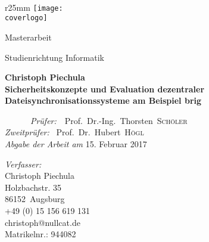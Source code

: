 \documentclass{scrartcl}
\makeatletter
\newcommand{\titel}{\Large Sicherheitskonzepte und Evaluation dezentraler Dateisynchronisationssysteme am Beispiel \frqq brig\flqq}
\newcommand{\untertitel}{Christoph Piechula}
\newcommand{\art}{Masterarbeit}
\newcommand{\autor}{Christoph Piechula}
\newcommand{\addresse}{Holzbachstr. 35}
\newcommand{\plz}{86152}
\newcommand{\ort}{Augsburg}
\newcommand{\telefon}{+49 (0) 15 156 619 131}
\newcommand{\mail}{christoph@nullcat.de}
\newcommand{\studienbereich}{Informatik}
\newcommand{\matrikelnr}{944082}
\newcommand{\pruefer}{Prof.\ Dr.-Ing.\ Thorsten\ \textsc{Schöler}}
\newcommand{\zweitpruefer}{Prof.\ Dr.\ Hubert\  \textsc{Högl}}
\newcommand{\coverlogo}{images/fh-logo.jpg}
\makeatother
\begin{document}
\thispagestyle{plain}
\begin{titlepage}
  \thispagestyle{empty}
  \addtolength{\textwidth}{55mm}
  \addtolength{\oddsidemargin}{-18mm}

  ~
  \begin{wrapfigure}{r}{25mm}
    \vspace{-40mm}
    \texttt{[image: \\coverlogo]}
  \end{wrapfigure}


  \vspace{-1mm}

  \huge{\textcolor{HSAorange}{\selectfont\art}}


  \vspace{10mm}
  \LARGE{Studienrichtung \studienbereich}
  \vspace{20mm}


  \begin{minipage}[t]{0.6\textwidth}
    \begin{center}
    \LARGE{\textbf{\textcolor{dkgray}{\untertitel}}} \\[1.2ex]
    \Huge{\textbf{\textcolor{HSAorange}{\titel}}}\\[1.2ex]
	\end{center}
	\vspace{2cm}
    \Large{\emph{\ \ \ \ \ \ Prüfer:}\ \ \pruefer}\\
    \Large{\emph{Zweitprüfer:} \ \zweitpruefer}\\
	\linebreak
	\linebreak
	\linebreak
	\linebreak
	\linebreak
	\linebreak
	\linebreak
	\linebreak
	\emph{Abgabe der Arbeit am} 15. Februar 2017\\
  \end{minipage}
  \hspace{0.11\textwidth}
  \begin{minipage}[t]{0.2\textwidth}
    \vspace{7cm}
    \scriptsize
    \emph{Verfasser:}\\
    \autor\\
    \addresse\\
    \plz\ \ort\\
    \telefon\\
    \mail\\
    Matrikelnr.: \matrikelnr\\
    

\end{minipage}
\end{titlepage}
\end{document}
